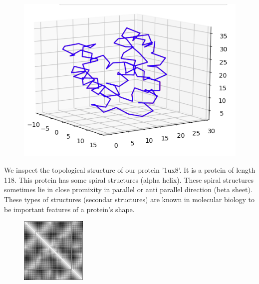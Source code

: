 \documentclass[12pt, a4paper, twocolumn, fullpage]{article}
\theoremstyle{plain}
\theoremstyle{definition}
\theoremstyle{remark}
\begin{document}
\begin{figure}[h]
	\includegraphics[width=\linewidth]{1ux8pdb.png}
	\caption{}
	\label{fig:network}
\end{figure}

We inspect the topological structure of our protein '1ux8'. It is a protein of length 118. This protein has some spiral structures (alpha helix). These spiral structures sometimes lie in close promixity in parallel or anti parallel direction (beta sheet). These types of structures (secondar structures) are known in molecular biology to be important features of a protein's shape.

\begin{figure}[h]
	\centering
	\includegraphics[width=.7\linewidth]{1ux8matBase}
	\caption{}
	\label{fig:network}
\end{figure}
	
\end{document}
